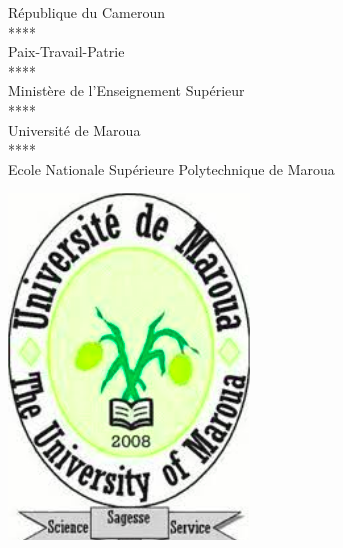 \documentclass[12pt,a4paper]{report}
\begin{document}

\thispagestyle{empty}
\begin{minipage}[c]{.35\textwidth}
    \footnotesize
    \begin{center}
    République du Cameroun\\
	****\\
	Paix-Travail-Patrie\\
	****\\
	Ministère de l’Enseignement Supérieur\\
	****\\
	Université de Maroua\\
	****\\
	Ecole Nationale Supérieure Polytechnique de Maroua\\
    \end{center}
\end{minipage}
\begin{minipage}[c]{.3\textwidth}
	\begin{center}
		\includegraphics[scale=0.4]{../imgs/univ.png}
	\end{center}
\end{minipage}
\end{document}
